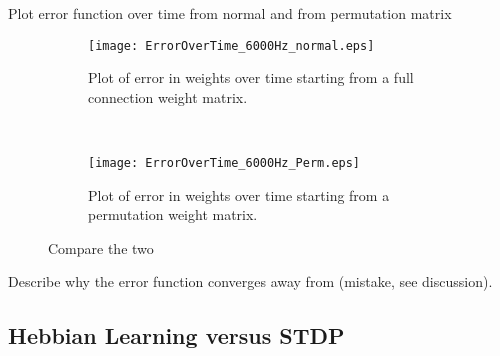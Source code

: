 Plot error function over time from normal and from permutation matrix

\begin{figure}[H]
\centering
\begin{subfigure}[b]{0.49\textwidth}
\texttt{[image: ErrorOverTime\_6000Hz\_normal.eps]}
\caption{Plot of error in weights over time starting from a full connection weight matrix.}
\label{Error_over_time: normal}
\end{subfigure}
\,
\begin{subfigure}[b]{0.49\textwidth}
\texttt{[image: ErrorOverTime\_6000Hz\_Perm.eps]}
\caption{Plot of error in weights over time starting from a permutation weight matrix.}
\label{Error_over_time: permutation}
\end{subfigure}
\caption{Compare the two}
\label{Error_over_time}
\end{figure}

Describe why the error function converges away from (mistake, see discussion).


\subsection{Hebbian Learning versus STDP}

